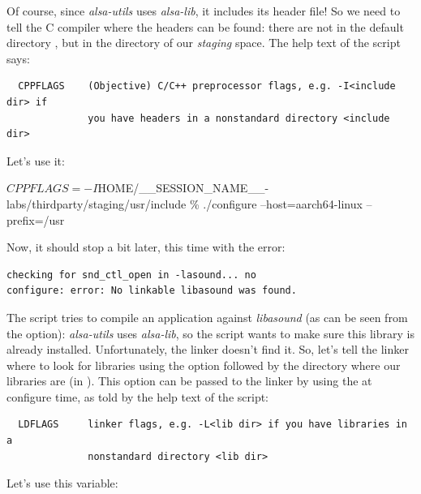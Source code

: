 Of course, since {\em alsa-utils} uses {\em alsa-lib}, it includes
its header file! So we need to tell the C compiler where the headers
can be found: there are not in the default directory
, but in the  directory of our
{\em staging} space. The help text of the  script says:

\begin{verbatim}
  CPPFLAGS    (Objective) C/C++ preprocessor flags, e.g. -I<include dir> if
              you have headers in a nonstandard directory <include dir>
\end{verbatim}

Let's use it:

\begin{bashinput}
$ CPPFLAGS=-I$HOME/__SESSION_NAME__-labs/thirdparty/staging/usr/include \%\linebreak
./configure --host=aarch64-linux --prefix=/usr
\end{bashinput}

Now, it should stop a bit later, this time with the error:
\begin{verbatim}
checking for snd_ctl_open in -lasound... no
configure: error: No linkable libasound was found.
\end{verbatim}

The  script tries to compile an application against {\em
  libasound} (as can be seen from the  option): {\em
  alsa-utils} uses {\em alsa-lib}, so the  script
wants to make sure this library is already installed. Unfortunately,
the  linker doesn't find it. So, let's tell the
linker where to look for libraries using the  option followed
by the directory where our libraries are (in
). This  option can be passed to the
linker by using the  at configure time, as told by the
help text of the  script:

\begin{verbatim}
  LDFLAGS     linker flags, e.g. -L<lib dir> if you have libraries in a
              nonstandard directory <lib dir>
\end{verbatim}

Let's use this  variable:


